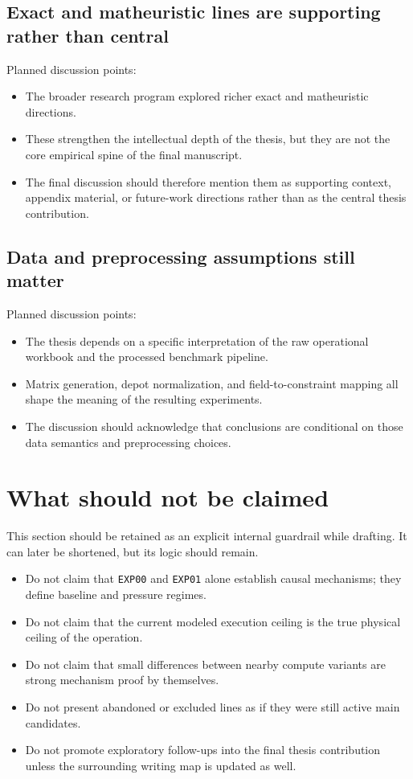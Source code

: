 \subsection{Exact and matheuristic lines are supporting rather than central}

Planned discussion points:
\begin{itemize}
    \item The broader research program explored richer exact and matheuristic directions.
    \item These strengthen the intellectual depth of the thesis, but they are not the core empirical spine of the final manuscript.
    \item The final discussion should therefore mention them as supporting context, appendix material, or future-work directions rather than as the central thesis contribution.
\end{itemize}

\subsection{Data and preprocessing assumptions still matter}

Planned discussion points:
\begin{itemize}
    \item The thesis depends on a specific interpretation of the raw operational workbook and the processed benchmark pipeline.
    \item Matrix generation, depot normalization, and field-to-constraint mapping all shape the meaning of the resulting experiments.
    \item The discussion should acknowledge that conclusions are conditional on those data semantics and preprocessing choices.
\end{itemize}

\section{What should not be claimed}

This section should be retained as an explicit internal guardrail while drafting. It can later be shortened, but its logic should remain.

\begin{itemize}
    \item Do not claim that \texttt{EXP00} and \texttt{EXP01} alone establish causal mechanisms; they define baseline and pressure regimes.
    \item Do not claim that the current modeled execution ceiling is the true physical ceiling of the operation.
    \item Do not claim that small differences between nearby compute variants are strong mechanism proof by themselves.
    \item Do not present abandoned or excluded lines as if they were still active main candidates.
    \item Do not promote exploratory follow-ups into the final thesis contribution unless the surrounding writing map is updated as well.
\end{itemize}


